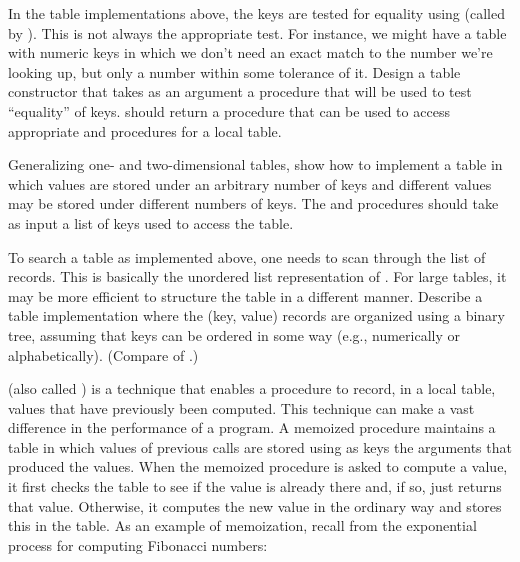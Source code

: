 \begin{exerciseGroup}
\label{Exercise 3.24}
 In the table implementations
above, the keys are tested for equality using  (called by
).  This is not always the appropriate test.  For instance, we
might have a table with numeric keys in which we don't need an exact match to
the number we're looking up, but only a number within some tolerance of it.
Design a table constructor  that takes as an argument a
 procedure that will be used to test ``equality'' of keys.
 should return a  procedure that can be used to
access appropriate  and  procedures for a local
table.

\label{Exercise 3.25}
 Generalizing one- and
two-dimensional tables, show how to implement a table in which values are
stored under an arbitrary number of keys and different values may be stored
under different numbers of keys.  The  and 
procedures should take as input a list of keys used to access the table.

\label{Exercise 3.26}
 To search a table as implemented
above, one needs to scan through the list of records.  This is basically the
unordered list representation of .  For large tables, it may
be more efficient to structure the table in a different manner.  Describe a
table implementation where the (key, value) records are organized using a
binary tree, assuming that keys can be ordered in some way (e.g., numerically
or alphabetically).  (Compare  of .)

\label{Exercise 3.27}
  (also
called ) is a technique that enables a procedure to record,
in a local table, values that have previously been computed.  This technique
can make a vast difference in the performance of a program.  A memoized
procedure maintains a table in which values of previous calls are stored using
as keys the arguments that produced the values.  When the memoized procedure is
asked to compute a value, it first checks the table to see if the value is
already there and, if so, just returns that value.  Otherwise, it computes the
new value in the ordinary way and stores this in the table.  As an example of
memoization, recall from  the exponential process for
computing Fibonacci numbers:


\end{exerciseGroup}
